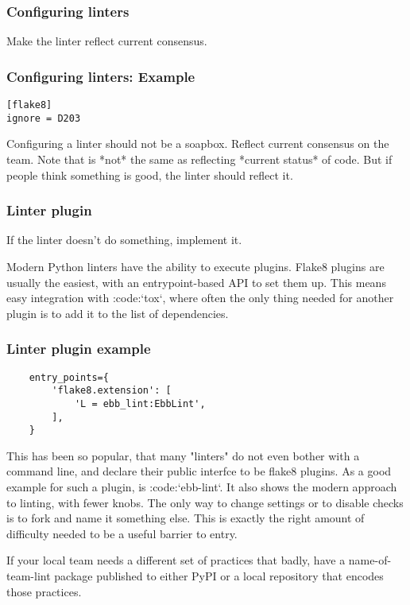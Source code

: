 \begin{frame}
\frametitle{Configuring linters}
Make the linter reflect current consensus.
\end{frame}

\begin{frame}[fragile]
\frametitle{Configuring linters: Example}

\begin{lstlisting}
[flake8]
ignore = D203
\end{lstlisting}

\end{frame}

Configuring a linter should not be a soapbox.
Reflect current consensus on the team.
Note that is *not* the same as
reflecting *current status* of code.
But if people think something is good,
the linter should reflect it.

\begin{frame}
\frametitle{Linter plugin}
If the linter doesn't do something,
implement it.
\end{frame}

Modern Python linters have the ability to execute plugins.
Flake8 plugins are usually the easiest,
with an entrypoint-based API to set them up.
This means easy integration with :code:`tox`,
where often the only thing needed for another plugin is to
add it to the list of dependencies.

\begin{frame}[fragile]
\frametitle{Linter plugin example}

\begin{lstlisting}
    entry_points={
        'flake8.extension': [
            'L = ebb_lint:EbbLint',
        ],
    }
\end{lstlisting}
\end{frame}


This has been so popular,
that many "linters" do not even bother with
a command line,
and declare their public interfce to be flake8 plugins.
As a good example for such a plugin,
is :code:`ebb-lint`.
It also shows the modern approach to linting,
with fewer knobs.
The only way to change settings
or to disable checks is to fork
and name it something else.
This is exactly the right amount of difficulty
needed to be a useful barrier to entry.

If your local team needs a different set of practices that badly,
have a name-of-team-lint package published to either PyPI
or a local repository
that encodes those practices.

